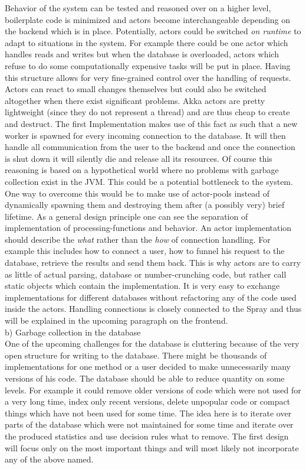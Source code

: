 \documentclass[twoside, 11pt]{scrartcl}
\begin{document}
Behavior of the system can be tested and reasoned over on a higher level, boilerplate code is minimized and actors become interchangeable depending on the backend which is in place. Potentially, actors could be switched \textit{on runtime} to adapt to situations in the system. For example there could be one actor which handles reads and writes but when the database is overloaded, actors  which refuse to do some computationally expensive tasks will be put in place. Having this structure allows for very fine-grained control over the handling of requests. Actors can react to small changes themselves but could also be switched altogether when there exist significant problems.
Akka actors are pretty lightweight (since they do not represent a thread) and are thus cheap to create and destruct. The first Implementation makes use of this fact as such that a new worker is spawned for every incoming connection to the database. It will then handle all communication from the user to the  backend  and once the connection is shut down it will silently die and release all its resources. Of course this reasoning is based on a hypothetical world where no problems with garbage collection exist in the JVM. This could be a potential bottleneck to the system. One way to overcome this would be to make use of actor-pools instead of dynamically spawning them and destroying them after (a possibly very) brief lifetime.
As a general design principle one can see the separation of implementation of processing-functions and behavior. An actor implementation should describe the \textit{what} rather than the \textit{how} of connection handling. For example this includes how to connect a user, how to funnel his request to the database, retrieve the results and send them back. This is why actors are to carry as little of actual parsing, database or number-crunching code, but rather call static objects which contain the implementation. It is very easy to exchange implementations for different databases without refactoring any of the code used inside the actors. Handling connections is closely connected to the Spray and thus will be explained in the upcoming paragraph on the frontend.\\

b) Garbage collection in the database\\
One of the upcoming challenges for the database is cluttering because of the very open structure for writing to the database.
There might be thousands of implementations for one method or a user decided to make unnecessarily many versions of his code.
The database should be able to reduce quantity on some levels. For example it could remove older versions of code which were not used for a very long time, index only recent versions, delete unpopular code or compact things which have not been used for some time.
The idea here is to iterate over parts of the database which were not maintained for some time and iterate over the produced statistics and use decision rules what to remove. The first design will focus only on the most important things and will most likely not incorporate any of the above named.\\
\end{document}
